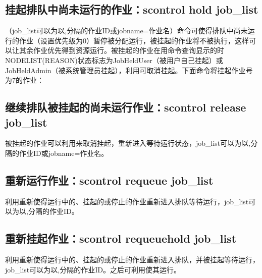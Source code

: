 \documentclass[a4paper,12pt,english]{sphinxmanual}
\begin{document}
\subsection{挂起排队中尚未运行的作业：scontrol hold job\_list}
\label{\detokenize{slurm/slurm:scontrol-hold-job-list}}
\sphinxAtStartPar
{}（job\_list可以为以,分隔的作业ID或jobname=作业名）命令可使得排队中尚未运行的作业（设置优先级为0）暂停被分配运行，被挂起的作业将不被执行，这样可以让其余作业优先得到资源运行。被挂起的作业在用命令查询显示的时NODELIST(REASON)状态标志为JobHeldUser（被用户自己挂起）或JobHeldAdmin（被系统管理员挂起），利用可取消挂起。下面命令将挂起作业号为7的作业：

\sphinxAtStartPar
{}


\subsection{继续排队被挂起的尚未运行作业：scontrol release job\_list}
\label{\detokenize{slurm/slurm:scontrol-release-job-list}}
\sphinxAtStartPar
被挂起的作业可以利用来取消挂起，重新进入等待运行状态，job\_list可以为以,分隔的作业ID或jobname=作业名。

\sphinxAtStartPar
{}


\subsection{重新运行作业：scontrol requeue job\_list}
\label{\detokenize{slurm/slurm:scontrol-requeue-job-list}}
\sphinxAtStartPar
利用重新使得运行中的、挂起的或停止的作业重新进入排队等待运行，job\_list可以为以,分隔的作业ID。


\subsection{重新挂起作业：scontrol requeuehold job\_list}
\label{\detokenize{slurm/slurm:scontrol-requeuehold-job-list}}
\sphinxAtStartPar
利用重新使得运行中的、挂起的或停止的作业重新进入排队，并被挂起等待运行，job\_list可以为以,分隔的作业ID。之后可利用使其运行。
\end{document}
